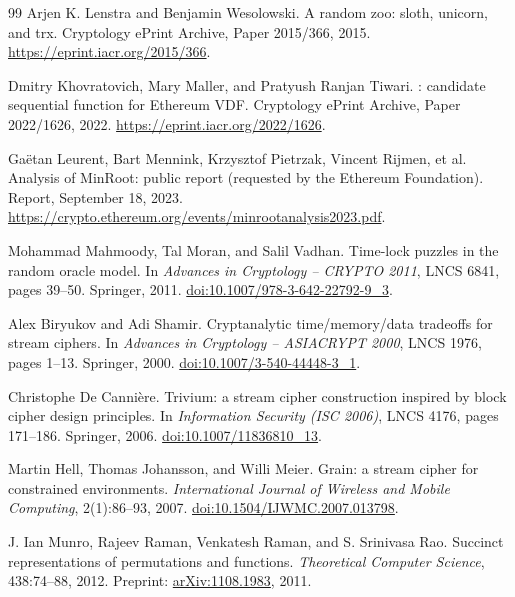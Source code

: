 \documentclass[11pt]{article}
\theoremstyle{definition}
\theoremstyle{remark}
\numberwithin{equation}{section}
\begin{document}
\begin{thebibliography}{99}
Arjen K. Lenstra and Benjamin Wesolowski.
\newblock A random zoo: sloth, unicorn, and trx.
\newblock Cryptology ePrint Archive, Paper 2015/366, 2015.
\newblock \url{https://eprint.iacr.org/2015/366}.

Dmitry Khovratovich, Mary Maller, and Pratyush Ranjan Tiwari.
: candidate sequential function for {Ethereum} {VDF}.
\newblock Cryptology ePrint Archive, Paper 2022/1626, 2022.
\newblock \url{https://eprint.iacr.org/2022/1626}.

Ga\"etan Leurent, Bart Mennink, Krzysztof Pietrzak, Vincent Rijmen, et al.
\newblock Analysis of {MinRoot}: public report (requested by the {Ethereum}
Foundation).
\newblock Report, September 18, 2023.
\newblock \url{https://crypto.ethereum.org/events/minrootanalysis2023.pdf}.

Mohammad Mahmoody, Tal Moran, and Salil Vadhan.
\newblock Time-lock puzzles in the random oracle model.
\newblock In \emph{Advances in Cryptology -- CRYPTO 2011}, LNCS 6841,
pages 39--50. Springer, 2011.
\newblock \href{https://doi.org/10.1007/978-3-642-22792-9_3}{doi:10.1007/978-3-642-22792-9\_3}.

Alex Biryukov and Adi Shamir.
\newblock Cryptanalytic time/memory/data tradeoffs for stream ciphers.
\newblock In \emph{Advances in Cryptology -- ASIACRYPT 2000}, LNCS 1976,
pages 1--13. Springer, 2000.
\newblock \href{https://doi.org/10.1007/3-540-44448-3_1}{doi:10.1007/3-540-44448-3\_1}.

Christophe De Canni\`ere.
\newblock Trivium: a stream cipher construction inspired by block cipher
design principles.
\newblock In \emph{Information Security (ISC 2006)}, LNCS 4176, pages
171--186. Springer, 2006.
\newblock \href{https://doi.org/10.1007/11836810_13}{doi:10.1007/11836810\_13}.

Martin Hell, Thomas Johansson, and Willi Meier.
\newblock Grain: a stream cipher for constrained environments.
\newblock \emph{International Journal of Wireless and Mobile Computing},
2(1):86--93, 2007.
\newblock \href{https://doi.org/10.1504/IJWMC.2007.013798}{doi:10.1504/IJWMC.2007.013798}.

J. Ian Munro, Rajeev Raman, Venkatesh Raman, and S. Srinivasa Rao.
\newblock Succinct representations of permutations and functions.
\newblock \emph{Theoretical Computer Science}, 438:74--88, 2012.
\newblock Preprint: \href{https://arxiv.org/abs/1108.1983}{arXiv:1108.1983}, 2011.


\end{thebibliography}
\end{document}
